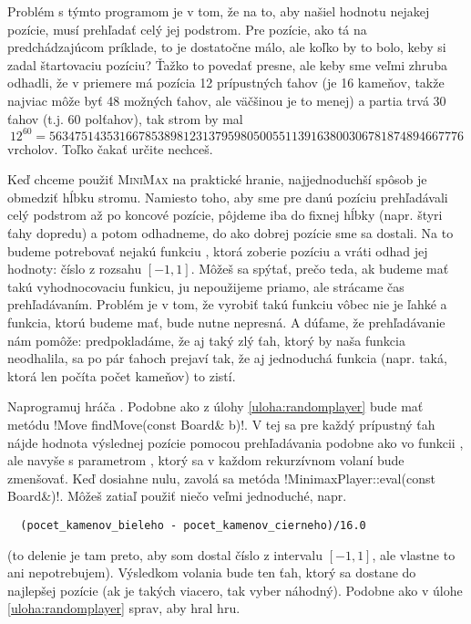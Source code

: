 Problém s týmto programom je v tom, že na to, aby našiel hodnotu nejakej pozície, musí prehľadať celý jej podstrom. Pre pozície, ako tá na predchádzajúcom príklade, to je dostatočne málo,
ale koľko by to bolo, keby si zadal štartovaciu pozíciu? Ťažko to povedať presne, ale keby sme veľmi zhruba odhadli, že v priemere má pozícia 12 prípustných ťahov (je 16 kameňov,
takže najviac môže byť 48 možných ťahov, ale väčšinou je to menej) a partia trvá 30 ťahov (t.j. 60 polťahov), tak strom by mal 
$$12^{60}=56347514353166785389812313795980500551139163800306781874894667776$$
vrcholov. Toľko čakať určite nechceš.



Keď chceme použiť {\scshape MiniMax} na praktické hranie, najjednoduchší spôsob je
obmedziť hĺbku stromu.  Namiesto toho, aby sme pre danú pozíciu prehľadávali
celý podstrom až po koncové pozície, pôjdeme iba do fixnej hĺbky (napr. štyri
ťahy dopredu) a potom odhadneme, do ako dobrej pozície sme sa dostali. Na to
budeme potrebovať nejakú funkciu , ktorá zoberie pozíciu a vráti odhad
jej hodnoty: číslo z rozsahu $[-1,1]$.  Môžeš sa spýtať, prečo teda, ak budeme
mať takú vyhodnocovaciu funkicu, ju nepoužijeme priamo, ale strácame čas 
prehľadávaním. Problém je v tom, že vyrobiť takú funkciu vôbec nie je ľahké a
funkcia, ktorú budeme mať, bude nutne nepresná. A dúfame, že prehľadávanie nám
pomôže: predpokladáme, že aj taký zlý ťah, ktorý by naša funkcia neodhalila,  sa po pár ťahoch prejaví tak, že aj
jednoduchá funkcia (napr. taká, ktorá len počíta počet kameňov) to zistí.

\begin{uloha}
  Naprogramuj hráča . Podobne ako  z úlohy \ref{uloha:randomplayer} bude mať metódu 
  \prg!Move findMove(const Board& b)!. V tej sa pre každý prípustný ťah nájde hodnota výslednej pozície pomocou  prehľadávania 
  podobne ako vo funkcii , ale navyše s parametrom , ktorý sa v každom rekurzívnom
  volaní bude zmenšovať. Keď dosiahne nulu, zavolá sa metóda \prg!MinimaxPlayer::eval(const Board&)!. 
  Môžeš zatiaľ použiť niečo veľmi jednoduché, napr. 

  \begin{lstlisting}
  (pocet_kamenov_bieleho - pocet_kamenov_cierneho)/16.0
  \end{lstlisting}
  
  (to delenie  je tam preto, aby som dostal číslo z intervalu $[-1,1]$, ale vlastne to ani nepotrebujem). Výsledkom volania  bude ten ťah, ktorý sa
  dostane do najlepšej pozície (ak je takých viacero, tak vyber náhodný).  Podobne ako v úlohe \ref{uloha:randomplayer} sprav, aby
   hral hru. 
\end{uloha}


